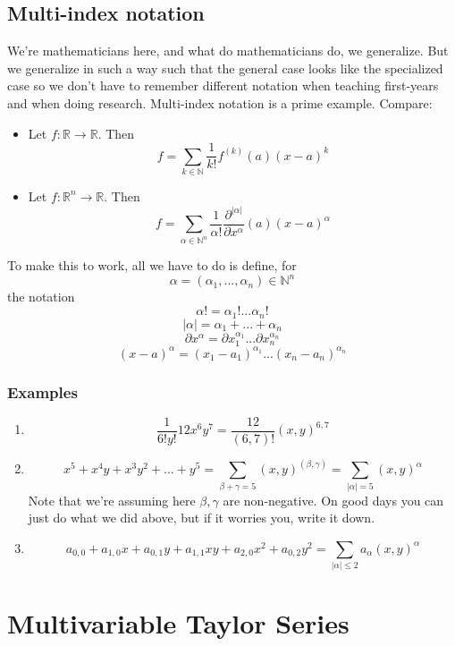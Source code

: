 \documentclass{article}
\newcommand{\reals}[0]{\mathbb{R}}
\newcommand{\nats}[0]{\mathbb{N}}
\begin{document}
\subsection{Multi-index notation}
We're mathematicians here, and what do mathematicians do, we generalize. But we generalize in such a way such that the general case looks like the specialized case so we don't have to remember different notation when teaching first-years and when doing research. Multi-index notation is a prime example. Compare:
\begin{itemize}

  \item Let \(f: \reals \to \reals\). Then
  \[f = \sum_{k \in \nats}\frac{1}{k!}f^{(k)}(a)(x - a)^k\]

  \item Let \(f: \reals^n \to \reals\). Then
  \[f = \sum_{\alpha \in \nats^n}\frac{1}{\alpha!}\frac{\partial^{|\alpha|}}{\partial x^\alpha}(a)(x - a)^\alpha\]

\end{itemize}
To make this to work, all we have to do is define, for
\[\alpha = (\alpha_1,...,\alpha_n) \in \nats^n\]
the notation
\[\alpha! = \alpha_1!...\alpha_n!\]
\[|\alpha| = \alpha_1 + ... + \alpha_n\]
\[\partial x^\alpha = \partial x_1^{\alpha_1} ... \partial x_n^{\alpha_n}\]
\[(x - a)^\alpha = (x_1 - a_1)^{\alpha_1}...(x_n - a_n)^{\alpha_n}\]

\subsubsection{Examples}
\begin{enumerate}

  \item
  \[\frac{1}{6!y!}12x^6y^7 = \frac{12}{(6, 7)!}(x, y)^{6, 7}\]

  \item
  \[x^5 + x^4y + x^3y^2 + ... + y^5 = \sum_{\beta + \gamma = 5}(x, y)^{(\beta, \gamma)} = \sum_{|\alpha| = 5}(x, y)^\alpha\]
  Note that we're assuming here \(\beta, \gamma\) are non-negative. On good days you can just do what we did above, but if it worries you, write it down.

  \item
  \[a_{0, 0} + a_{1, 0}x + a_{0, 1}y + a_{1, 1}xy + a_{2, 0}x^2 + a_{0, 2}y^2 = \sum_{|\alpha| \leq 2}a_{\alpha}(x, y)^{\alpha}\]

\end{enumerate}

\section{Multivariable Taylor Series}
\end{document}
